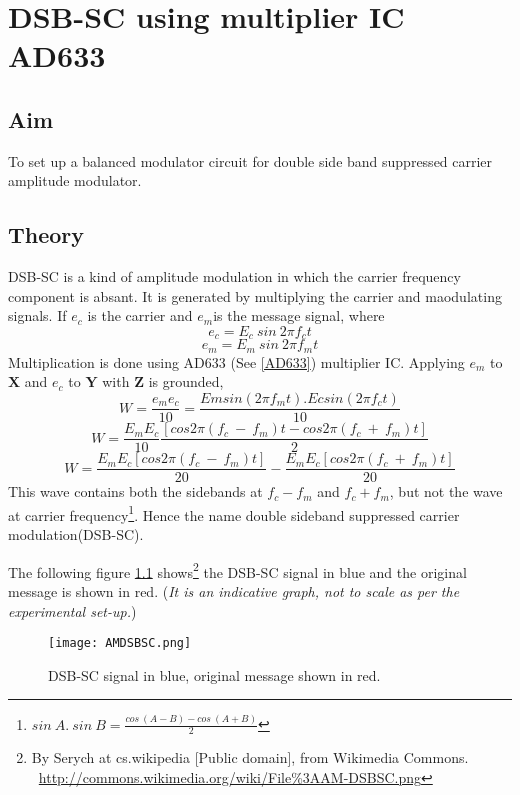 \chapter[DSB-SC using multiplier IC AD633]{DSB-SC using multiplier IC AD633}
\label{chapdsbsc}
\section*{Aim}
To set up a balanced modulator circuit for double side band suppressed carrier amplitude modulator.
\section*{Theory}
DSB-SC is a kind of amplitude modulation in which the carrier frequency component is absant. It is generated by multiplying the carrier and maodulating signals. If $e_c$ is the carrier and $e_m$is the message signal, where
\begin{equation}
e_c=E_c\  sin\ 2\pi f_ct
\end{equation}
\begin{equation}
e_m=E_m\  sin\ 2\pi f_mt
\end{equation}
Multiplication is done using AD633 (See \ref{AD633}) multiplier IC.
Applying $e_m$ to $\textbf{X}$ and $e_c$ to $\textbf{Y}$ with $\textbf{Z}$ is grounded, 
\begin{equation}
W= \frac{e_me_c}{10} =\frac{Emsin(2\pi f_mt).Ecsin(2\pi f_ct)}{10}
\end{equation}
\begin{equation}
W= \frac{E_mE_c}{10} \frac{[cos 2\pi (f_c\ -\ f_m)t-cos 2\pi (f_c\ +\ f_m)t]}{2}
\end{equation}
\begin{equation}
W= \frac{E_mE_c [cos 2\pi (f_c\ -\ f_m)t]}{20}- \frac{E_mE_c[cos 2\pi (f_c\ +\ f_m)t]}{20}
\end{equation}
This wave contains both the sidebands at $f_c-f_m$ and $f_c+f_m$, but not the wave at carrier frequency\footnote{$sin \ A.\ sin\ B=\frac{cos\ (A-B)-cos\ (A+B)}{2}$}. Hence the name double sideband suppressed carrier modulation(DSB-SC).

The following figure \ref{DSBSC} shows\footnote{By Serych at cs.wikipedia [Public domain], from Wikimedia Commons.  \ \url{http://commons.wikimedia.org/wiki/File\%3AAM-DSBSC.png}} the DSB-SC signal in blue and the original message is shown in red. (\emph{It is an indicative graph, not to scale as per the experimental set-up.})
\begin{figure}[h]
\begin{center}
\texttt{[image: AMDSBSC.png]}
\caption{DSB-SC signal in blue, original message shown in red.}
\label{DSBSC}
\end{center}

\end{figure}

